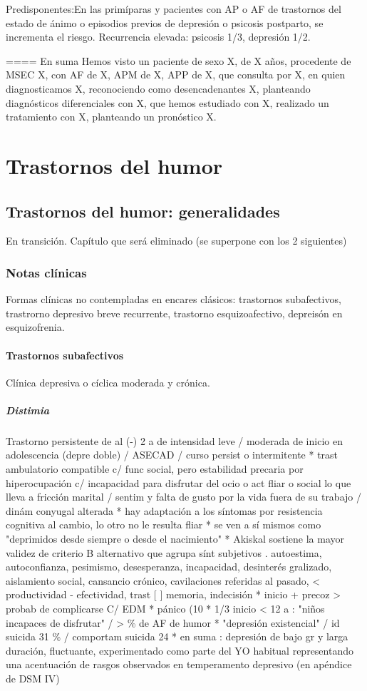 \documentclass{scrbook}
\begin{document}
Predisponentes:En las primíparas y pacientes con AP o AF de trastornos del estado de ánimo o episodios previos de depresión o psicosis postparto, se incrementa el riesgo.
Recurrencia elevada: psicosis 1/3, depresión 1/2.

==== En suma
Hemos visto un paciente de sexo X, de X años, procedente de MSEC X, con AF de X, APM de X, APP de X, que consulta por X, en quien diagnosticamos X, reconociendo como desencadenantes X, planteando diagnósticos diferenciales con X, que hemos estudiado con X, realizado un tratamiento con X, planteando un pronóstico X.
\printbibliography[]
\part{Trastornos del humor}
\chapter{Trastornos del humor: generalidades}
\faStopCircle En transición. Capítulo que será eliminado (se superpone con los 2 siguientes)
\section*{Notas clínicas}
Formas clínicas no contempladas en encares clásicos: trastornos subafectivos, trastrorno depresivo breve recurrente, trastorno esquizoafectivo, depreisón en esquizofrenia.
\subsection*{Trastornos subafectivos}
Clínica depresiva o cíclica moderada y crónica.
\subsubsection*{Distimia}
Trastorno persistente de al (-) 2 a de intensidad leve / moderada de inicio en adolescencia (depre doble) / ASECAD / curso persist o intermitente
* trast ambulatorio compatible c/ func social, pero estabilidad precaria por hiperocupación c/ incapacidad para disfrutar del ocio o act fliar o social lo que lleva a fricción marital / sentim y falta de gusto por la vida fuera de su trabajo / dinám conyugal alterada
* hay adaptación a los síntomas por resistencia cognitiva al cambio, lo otro no le resulta fliar
* se ven a sí mismos como "deprimidos desde siempre o desde el nacimiento"
* Akiskal sostiene la mayor validez de criterio B alternativo que agrupa sínt subjetivos . autoestima, autoconfianza, pesimismo, desesperanza, incapacidad, desinterés gralizado, aislamiento social, cansancio crónico, cavilaciones referidas al pasado, < productividad - efectividad, trast [ ] memoria, indecisión
* inicio + precoz > probab de complicarse C/ EDM
* pánico (10 %
* 1/3 inicio < 12 a : "niños incapaces de disfrutar" / > \% de AF de humor
* "depresión existencial" / id suicida 31 \% / comportam suicida 24 %
* en suma : depresión de bajo gr y larga duración, fluctuante, experimentado como parte del YO habitual representando una acentuación de rasgos observados en temperamento depresivo (en apéndice de DSM IV)
\end{document}
